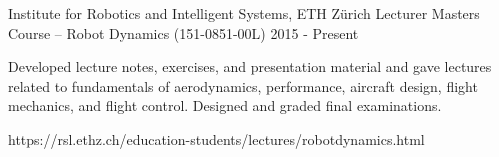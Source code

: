 \label{sec:teaching}
\begin{cventries}


\cvteachentry
  	{Institute for Robotics and Intelligent Systems, ETH Z\"{u}rich} %
  	{Lecturer} %
    {Masters Course -- Robot Dynamics (151-0851-00L)} %
    {2015 - Present} %
    {
      \begin{cvitems} %
        \item Developed lecture notes, exercises, and presentation material and gave lectures related to fundamentals of aerodynamics, performance, aircraft design, flight mechanics, and flight control. Designed and graded final examinations.
      \end{cvitems}
    } %
    {https://rsl.ethz.ch/education-students/lectures/robotdynamics.html} %
    {\showteachingdescriptions}


\end{cventries}
